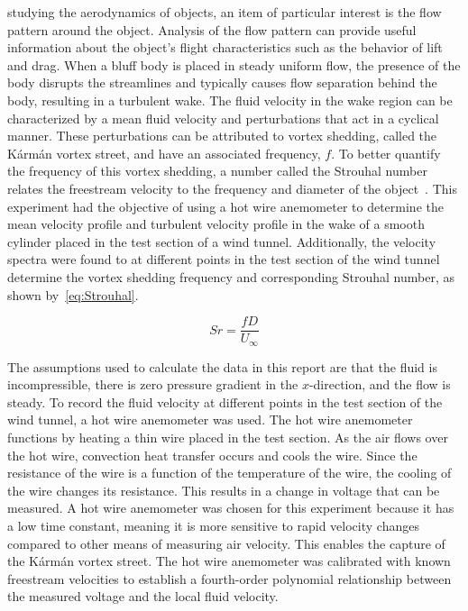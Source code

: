 \documentclass[journal,letterpaper]{IEEEtran}
\begin{document}
 studying the aerodynamics of objects, an item of particular interest is the flow pattern around the object.
Analysis of the flow pattern can provide useful information about the object's flight characteristics such as the behavior of lift and drag.
When a bluff body is placed in steady uniform flow, the presence of the body disrupts the streamlines and typically causes flow separation behind the body, resulting in a turbulent wake.
The fluid velocity in the wake region can be characterized by a mean fluid velocity and perturbations that act in a cyclical manner.
These perturbations can be attributed to vortex shedding, called the Kármán vortex street, and have an associated frequency, $f$. To better quantify the frequency of this vortex shedding, a number called the Strouhal number relates the freestream velocity to the frequency and diameter of the object~\cite{Strouhal}.
This experiment had the objective of using a hot wire anemometer to determine the mean velocity profile and turbulent velocity profile in the wake of a smooth cylinder placed in the test section of a wind tunnel.
Additionally, the velocity spectra were found to at different points in the test section of the wind tunnel determine the vortex shedding frequency and corresponding Strouhal number, as shown by~\eqref{eq:Strouhal}.

\begin{equation} \label{eq:Strouhal}
    Sr = \frac{fD}{U_\infty}
\end{equation}

The assumptions used to calculate the data in this report are that the fluid is incompressible, there is zero pressure gradient in the $x$-direction, and the flow is steady.
To record the fluid velocity at different points in the test section of the wind tunnel, a hot wire anemometer was used.
The hot wire anemometer functions by heating a thin wire placed in the test section.
As the air flows over the hot wire, convection heat transfer occurs and cools the wire.
Since the resistance of the wire is a function of the temperature of the wire, the cooling of the wire changes its resistance.
This results in a change in voltage that can be measured.
A hot wire anemometer was chosen for this experiment because it has a low time constant, meaning it is more sensitive to rapid velocity changes compared to other means of measuring air velocity.
This enables the capture of the Kármán vortex street.
The hot wire anemometer was calibrated with known freestream velocities to establish a fourth-order polynomial relationship between the measured voltage and the local fluid velocity.
\end{document}
